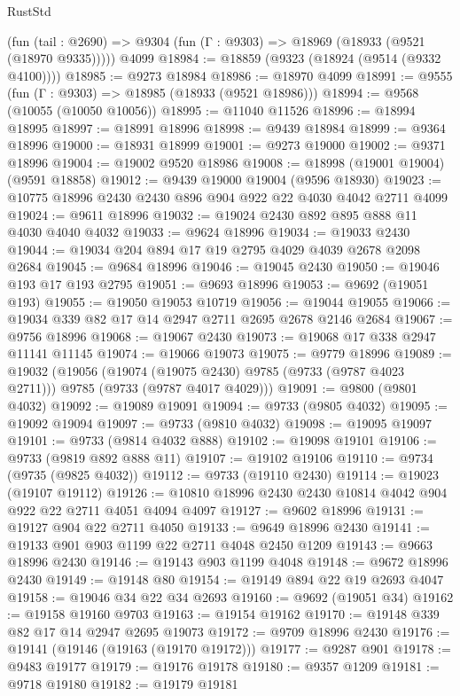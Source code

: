 \begin{lexlean}{RustStd}
\begin{coremodule}
{\begin{coremodule}
{{{{{{{{{{{{{{{{{{{{{{{{{{{{{{{{{{{{{{{{{{{{{{{{{{{{{{{    (fun (tail : @2690) => @9304 (fun (Γ : @9303) => @18969 (@18933 (@9521 (@18970 @9335)))))
    @4099
@18984 := @18859 (@9323 (@18924 (@9514 (@9332 @4100))))
@18985 := @9273 @18984
@18986 := @18970 @4099
@18991 := @9555 (fun (Γ : @9303) => @18985 (@18933 (@9521 @18986)))
@18994 := @9568 (@10055 (@10050 @10056))
@18995 := @11040 @11526
@18996 := @18994 @18995
@18997 := @18991 @18996
@18998 := @9439 @18984
@18999 := @9364 @18996
@19000 := @18931 @18999
@19001 := @9273 @19000
@19002 := @9371 @18996
@19004 := @19002 @9520 @18986
@19008 := @18998 (@19001 @19004) (@9591 @18858)
@19012 := @9439 @19000 @19004 (@9596 @18930)
@19023 := @10775 @18996 @2430 @2430 @896 @904 @922 @22 @4030 @4042 @2711 @4099
@19024 := @9611 @18996
@19032 := @19024 @2430 @892 @895 @888 @11 @4030 @4040 @4032
@19033 := @9624 @18996
@19034 := @19033 @2430
@19044 := @19034 @204 @894 @17 @19 @2795 @4029 @4039 @2678 @2098 @2684
@19045 := @9684 @18996
@19046 := @19045 @2430
@19050 := @19046 @193 @17 @193 @2795
@19051 := @9693 @18996
@19053 := @9692 (@19051 @193)
@19055 := @19050 @19053 @10719
@19056 := @19044 @19055
@19066 := @19034 @339 @82 @17 @14 @2947 @2711 @2695 @2678 @2146 @2684
@19067 := @9756 @18996
@19068 := @19067 @2430
@19073 := @19068 @17 @338 @2947 @11141 @11145
@19074 := @19066 @19073
@19075 := @9779 @18996
@19089 := @19032
    (@19056
      (@19074 (@19075 @2430) @9785 (@9733 (@9787 @4023 @2711)))
      @9785
      (@9733 (@9787 @4017 @4029)))
@19091 := @9800 (@9801 @4032)
@19092 := @19089 @19091
@19094 := @9733 (@9805 @4032)
@19095 := @19092 @19094
@19097 := @9733 (@9810 @4032)
@19098 := @19095 @19097
@19101 := @9733 (@9814 @4032 @888)
@19102 := @19098 @19101
@19106 := @9733 (@9819 @892 @888 @11)
@19107 := @19102 @19106
@19110 := @9734 (@9735 (@9825 @4032))
@19112 := @9733 (@19110 @2430)
@19114 := @19023 (@19107 @19112)
@19126 := @10810 @18996 @2430 @2430 @10814 @4042 @904 @922 @22 @2711 @4051 @4094 @4097
@19127 := @9602 @18996
@19131 := @19127 @904 @22 @2711 @4050
@19133 := @9649 @18996 @2430
@19141 := @19133 @901 @903 @1199 @22 @2711 @4048 @2450 @1209
@19143 := @9663 @18996 @2430
@19146 := @19143 @903 @1199 @4048
@19148 := @9672 @18996 @2430
@19149 := @19148 @80
@19154 := @19149 @894 @22 @19 @2693 @4047
@19158 := @19046 @34 @22 @34 @2693
@19160 := @9692 (@19051 @34)
@19162 := @19158 @19160 @9703
@19163 := @19154 @19162
@19170 := @19148 @339 @82 @17 @14 @2947 @2695 @19073
@19172 := @9709 @18996 @2430
@19176 := @19141 (@19146 (@19163 (@19170 @19172)))
@19177 := @9287 @901
@19178 := @9483 @19177
@19179 := @19176 @19178
@19180 := @9357 @1209
@19181 := @9718 @19180
@19182 := @19179 @19181
}}}}}}}}}}}}}}}}}}}}}}}}}}}}}}}}}}}}}}}}}}}}}}}}}}}}}}}
\end{coremodule}}
\end{coremodule}
\end{lexlean}
